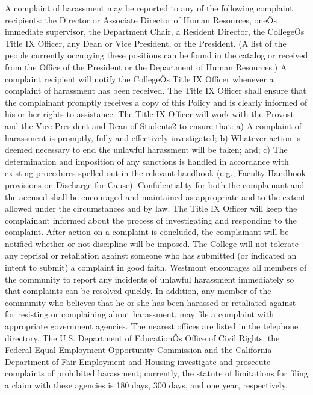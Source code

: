 \documentclass[letterpaper, 11pt]{article}
\begin{document}
			A complaint of harassment may be reported to any of the following complaint recipients:  the Director or Associate Director of Human Resources, oneÕs immediate supervisor, the Department Chair, a Resident Director, the CollegeÕs Title IX Officer, any Dean or Vice President, or the President.  (A list of the people currently occupying these positions can be found in the catalog or received from the Office of the President or the Department of Human Resources.)
			A complaint recipient will notify the CollegeÕs Title IX Officer whenever a complaint of harassment has been received.  The Title IX Officer shall ensure that the complainant promptly receives a copy of this Policy and is clearly informed of his or her rights to assistance.
			The Title IX Officer will work with the Provost and the Vice President and Dean of Students2 to ensure that:
			a) A complaint of harassment is promptly, fully and effectively investigated;
			b) Whatever action is deemed necessary to end the unlawful harassment will be taken; and;
			c) The determination and imposition of any sanctions is handled in accordance with existing procedures spelled out in the relevant handbook (e.g., Faculty Handbook provisions on Discharge for Cause).
			Confidentiality for both the complainant and the accused shall be encouraged and maintained as appropriate and to the extent allowed under the circumstances and by law.
			The Title IX Officer will keep the complainant informed about the process of investigating and responding to the complaint.  After action on a complaint is concluded, the complainant will be notified whether or not discipline will be imposed.  The College will not tolerate any reprisal or retaliation against someone who has submitted (or indicated an intent to submit) a complaint in good faith.
			Westmont encourages all members of the community to report any incidents of unlawful harassment immediately so that complaints can be resolved quickly.  In addition, any member of the community who believes that he or she has been harassed or retaliated against for resisting or complaining about harassment, may file a complaint with appropriate government agencies.  The nearest offices are listed in the telephone directory. The U.S. Department of EducationÕs Office of Civil Rights, the Federal Equal Employment Opportunity Commission and the California Department of Fair Employment and Housing investigate and prosecute complaints of prohibited harassment; currently, the statute of limitations for filing a claim with these agencies is 180 days, 300 days, and one year, respectively.
\end{document}
